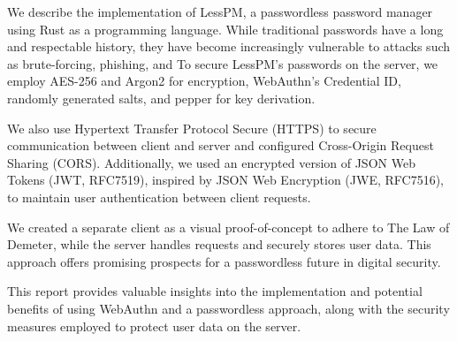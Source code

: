 We describe the implementation of LessPM, a passwordless password manager
using Rust as a programming language.
While traditional passwords have a long and respectable history, they have
become increasingly vulnerable to attacks such as brute-forcing, phishing, and
To secure LessPM's passwords on the server, we employ AES-256 and Argon2 for
encryption, WebAuthn's Credential ID, randomly generated salts, and pepper for
key derivation.

We also use Hypertext Transfer Protocol Secure (HTTPS) to secure
communication between client and server and configured Cross-Origin Request
Sharing (CORS).
Additionally, we used an encrypted version of JSON Web Tokens (JWT, RFC7519),
inspired by JSON Web Encryption (JWE, RFC7516), to maintain user authentication
between client requests.

We created a separate client as a visual proof-of-concept to adhere to The
Law of Demeter,
 while the server handles requests and securely stores user data.
This approach offers promising prospects for a passwordless future in digital
security.

This report provides valuable insights into the implementation and potential
benefits of using WebAuthn and a passwordless approach, along with the security
measures employed to protect user data on the server.